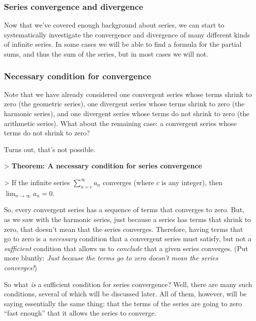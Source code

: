 \subsubsection{Series convergence and divergence}
\label{sss:seri-f0f7}


Now that we've covered enough background about series, we can start to
systematically investigate the convergence and divergence of many
different kinds of infinite series. In some cases we will be able to
find a formula for the partial sums, and thus the sum of the series, but
in most cases we will not.


\subsubsection{Necessary condition for convergence}
\label{sss:nece-6314}


Note that we have already considered one convergent series whose terms shrink to zero (the geometric series), one divergent series whose terms shrink to zero (the harmonic series), and one divergent series whose terms do not shrink to zero (the arithmetic series). What about the remaining case: a convergent series whose terms do not shrink to zero?


Turns out, that's not possible.


> \textbf{Theorem: A necessary condition for series convergence}

> If the infinite series $\sum _{n=c}^\infty a_n$ converges (where $c$ is any integer), then $\lim _{n\to\infty} a_n = 0$.


So, every convergent series has a sequence of terms that converges to zero. But, as we saw with the harmonic series, just because a series has terms that shrink to zero, that doesn't mean that the series converges. Therefore, having terms that go to zero is a \textit{necessary} condition that a convergent series must satisfy, but not a \textit{sufficient} condition that allows us to \textit{conclude} that a given series converges. (Put more bluntly: \textit{Just because the terms go to zero doesn't mean the series converges!})


So what \textit{is} a sufficient condition for series convergence? Well, there are many such conditions, several of which will be discussed later. All of them, however, will be saying essentially the same thing: that the terms of the series are going to zero ``fast enough'' that it allows the series to converge.


